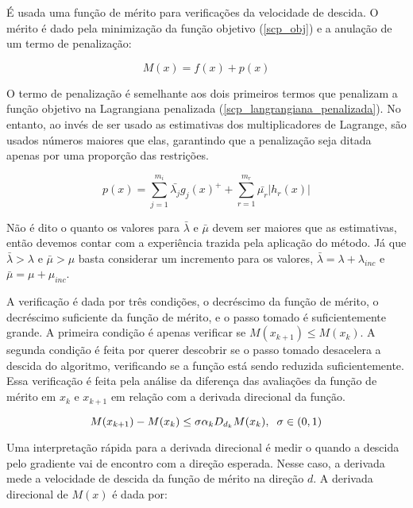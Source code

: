 \noindent
É usada uma função de mérito para verificações da velocidade de descida. O mérito é dado pela
minimização da função objetivo (\ref{scp_obj}) e a anulação de um termo de penalização:

\begin{equation}
  M(x) = f(x) + p(x)
\end{equation}


O termo de penalização é semelhante aos dois primeiros termos que penalizam a função objetivo
na Lagrangiana penalizada (\ref{scp_langrangiana_penalizada}). No entanto, ao invés de ser
usado as estimativas dos multiplicadores de Lagrange, são usados números maiores que elas,
garantindo que a penalização seja ditada apenas por uma proporção das restrições.


\begin{equation}
 p(x) = \sum_{j=1}^{m_i} \bar{\lambda_j} g_j(x)^+ + \sum_{r=1}^{m_r} \bar{\mu_r} |h_r(x)|
\end{equation}


Não é dito o quanto os valores para \(\bar{\lambda}\) e \(\bar{\mu}\) devem ser maiores que
as estimativas, então devemos contar com a experiência trazida pela aplicação do método.
Já que \(\bar{\lambda} > \lambda\) e \(\bar{\mu} > \mu\) basta considerar um incremento
para os valores, \(\bar{\lambda} = \lambda + \lambda_{inc}\) e  \(\bar{\mu} = \mu + \mu_{inc}\).


A verificação é dada por três condições, o decréscimo da função de mérito, o decréscimo
suficiente da função de mérito, e o passo tomado é suficientemente grande. A primeira
condição é apenas verificar se \(M(x_{k+1}) \leq M(x_k)\). A segunda condição é feita
por querer descobrir se o passo tomado desacelera a descida do algoritmo, verificando
se a função está sendo reduzida suficientemente. Essa verificação é feita pela análise
da diferença das avaliações da função de mérito em \(x_k\) e \(x_{k+1}\) em relação
com a derivada direcional da função.

\begin{equation}
  M(x_{k+1}) - M(x_k) \leq \sigma \alpha_k D_{d_k} M(x_k), \hspace{0.2cm} \sigma \in (0, 1)
\end{equation}

Uma interpretação rápida para a derivada direcional é medir o quando a descida pelo
gradiente vai de encontro com a direção esperada. Nesse caso, a derivada mede a velocidade
de descida da função de mérito na direção \(d\). A derivada direcional de \(M(x)\) é dada
por:

